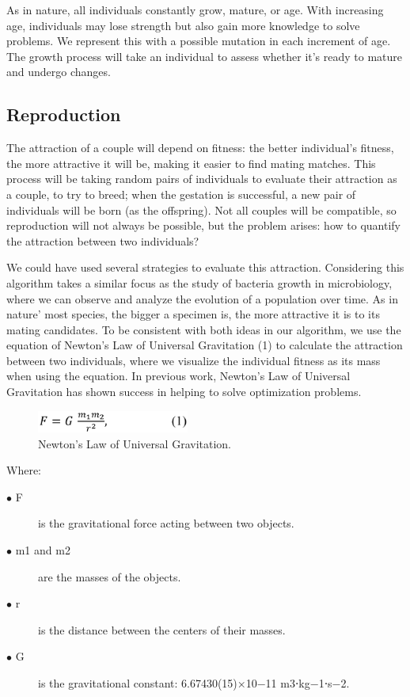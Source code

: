 \documentclass[runningheads]{llncs}
\begin{document}
As in nature, all individuals constantly grow, mature, or age. With increasing
age, individuals may lose strength but also gain more knowledge to solve
problems. We represent this with a possible mutation in each increment of age.
The growth process will take an individual to assess whether it's ready to
mature and undergo changes.

\subsection{Reproduction}

The attraction of a couple will depend on fitness: the better individual's
fitness, the more attractive it will be, making it easier to find mating
matches. This process will be taking random pairs of individuals to evaluate
their attraction as a couple, to try to breed; when the gestation is
successful, a new pair of individuals will be born (as the offspring). Not all
couples will be compatible, so reproduction will not always be possible, but
the problem arises: how to quantify the attraction between two individuals?

We could have used several strategies to evaluate this attraction. Considering
this algorithm takes a similar focus as the study of bacteria growth in
microbiology, where we can observe and analyze the evolution of a population
over time. As in nature' most species, the bigger a specimen is, the more
attractive it is to its mating candidates. To be consistent with both ideas in
our algorithm, we use the equation of Newton's Law of Universal Gravitation (1)
to calculate the attraction between two individuals, where we visualize the
individual fitness as its mass when using the equation. In previous work,
Newton's Law of Universal Gravitation has shown success in helping to solve
optimization problems.

\begin{figure}
    \centering
    \includegraphics[width=50mm]{img/fig3_newtonslaw.pdf}
    \caption{Newton's Law of Universal Gravitation.} \label{fig3}
    \end{figure}

Where:
\begin{description}  %
    \item[$\bullet$ F] is the gravitational force acting between two objects.
    \item[$\bullet$ m1 and m2] are the masses of the objects.
    \item[$\bullet$ r]	is the distance between the centers of their masses.
    \item[$\bullet$ G]	is the gravitational constant: 6.67430(15)×10−11 m3⋅kg−1⋅s−2.
\end{description}
\end{document}
